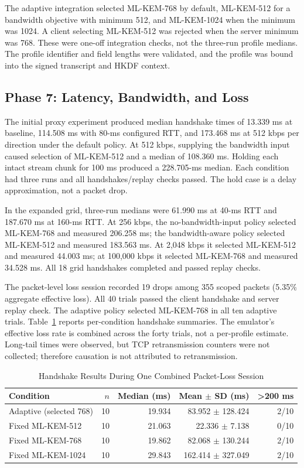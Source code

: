 \documentclass[journal]{IEEEtran}
\begin{document}
The adaptive integration selected ML-KEM-768 by default, ML-KEM-512 for a bandwidth objective with minimum 512, and ML-KEM-1024 when the minimum was 1024. A client selecting ML-KEM-512 was rejected when the server minimum was 768. These were one-off integration checks, not the three-run profile medians. The profile identifier and field lengths were validated, and the profile was bound into the signed transcript and HKDF context.

\subsection{Phase 7: Latency, Bandwidth, and Loss}
The initial proxy experiment produced median handshake times of 13.339 ms at baseline, 114.508 ms with 80-ms configured RTT, and 173.468 ms at 512 kbps per direction under the default policy. At 512 kbps, supplying the bandwidth input caused selection of ML-KEM-512 and a median of 108.360 ms. Holding each intact stream chunk for 100 ms produced a 228.705-ms median. Each condition had three runs and all handshakes/replay checks passed. The hold case is a delay approximation, not a packet drop.

In the expanded grid, three-run medians were 61.990 ms at 40-ms RTT and 187.670 ms at 160-ms RTT. At 256 kbps, the no-bandwidth-input policy selected ML-KEM-768 and measured 206.258 ms; the bandwidth-aware policy selected ML-KEM-512 and measured 183.563 ms. At 2,048 kbps it selected ML-KEM-512 and measured 44.003 ms; at 100,000 kbps it selected ML-KEM-768 and measured 34.528 ms. All 18 grid handshakes completed and passed replay checks.

The packet-level loss session recorded 19 drops among 355 scoped packets (5.35\% aggregate effective loss). All 40 trials passed the client handshake and server replay check. The adaptive policy selected ML-KEM-768 in all ten adaptive trials. Table~\ref{tab:loss} reports per-condition handshake summaries. The emulator's effective loss rate is combined across the forty trials, not a per-profile estimate. Long-tail times were observed, but TCP retransmission counters were not collected; therefore causation is not attributed to retransmission.

\begin{table}[t]
\caption{Handshake Results During One Combined Packet-Loss Session}
\label{tab:loss}
\centering
\footnotesize
\begin{tabular}{lrrrr}
\toprule
Condition & $n$ & Median (ms) & Mean $\pm$ SD (ms) & >200 ms \\
\midrule
Adaptive (selected 768) & 10 & 19.934 & 83.952 $\pm$ 128.424 & 2/10 \\
Fixed ML-KEM-512 & 10 & 21.063 & 22.336 $\pm$ 7.138 & 0/10 \\
Fixed ML-KEM-768 & 10 & 19.862 & 82.068 $\pm$ 130.244 & 2/10 \\
Fixed ML-KEM-1024 & 10 & 29.843 & 162.414 $\pm$ 327.049 & 2/10 \\
\bottomrule
\end{tabular}
\end{table}
\end{document}

